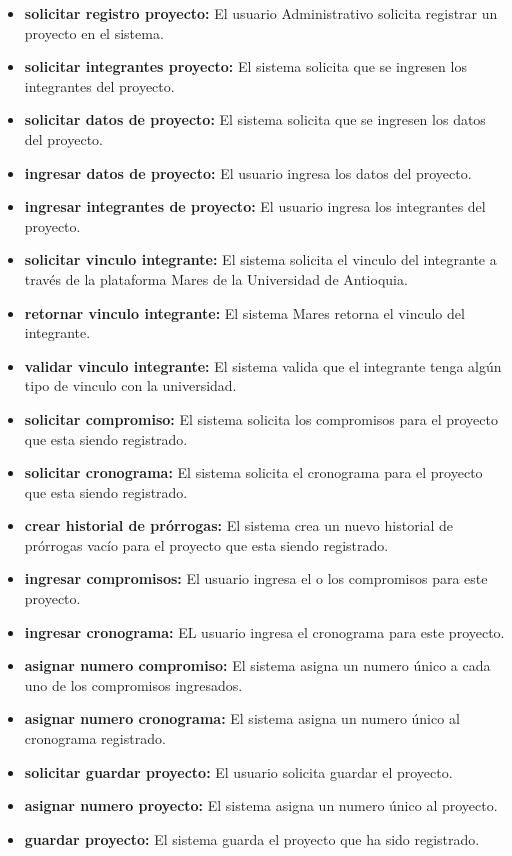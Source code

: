 \documentclass[12pt,oneside,letterpaper]{report}
\begin{document}
\begin{itemize}
 \item \textbf{solicitar registro proyecto:} El usuario Administrativo solicita registrar un proyecto en el sistema.
 \item \textbf{solicitar integrantes proyecto:} El sistema solicita que se ingresen los integrantes del proyecto.
 \item \textbf{solicitar datos de proyecto:} El sistema solicita que se ingresen los datos del proyecto.
 \item \textbf{ingresar datos de proyecto:} El usuario ingresa los datos del proyecto.
 \item \textbf{ingresar integrantes de proyecto:} El usuario ingresa los integrantes del proyecto.
 \item \textbf{solicitar vinculo integrante:} El sistema solicita el vinculo del integrante a través de la plataforma Mares de la Universidad de Antioquia.
 \item \textbf{retornar vinculo integrante:} El sistema Mares retorna el vinculo del integrante.
 \item \textbf{validar vinculo integrante:} El sistema valida que el integrante tenga algún tipo de vinculo con la universidad.
 \item \textbf{solicitar compromiso:} El sistema solicita los compromisos para el proyecto que esta siendo registrado.
 \item \textbf{solicitar cronograma:} El sistema solicita el cronograma para el proyecto que esta siendo registrado.
 \item \textbf{crear historial de prórrogas:} El sistema crea un nuevo historial de prórrogas vacío para el proyecto que esta siendo registrado.
 \item \textbf{ingresar compromisos:} El usuario ingresa el o los compromisos para este proyecto.
 \item \textbf{ingresar cronograma:} EL usuario ingresa el cronograma para este proyecto.
 \item \textbf{asignar numero compromiso:} El sistema asigna un numero único a cada uno de los compromisos ingresados.
 \item \textbf{asignar numero cronograma:} El sistema asigna un numero único al cronograma registrado.
 \item \textbf{solicitar guardar proyecto:} El usuario solicita guardar el proyecto.
 \item \textbf{asignar numero proyecto:} El sistema asigna un numero único al proyecto.
 \item \textbf{guardar proyecto:} El sistema guarda el proyecto que ha sido registrado.
\end{itemize}
\end{document}
